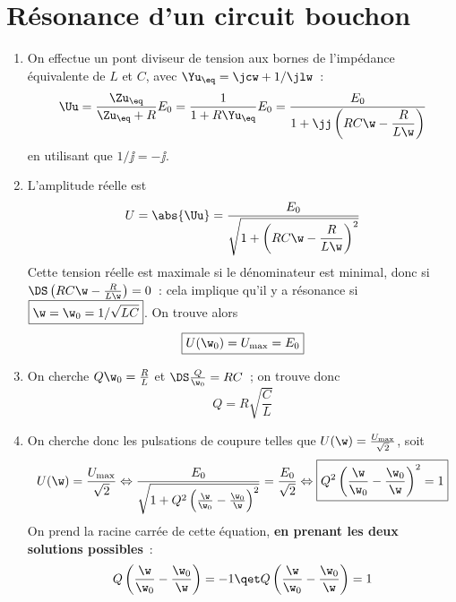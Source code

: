 \documentclass[a4paper, 12pt, final, garamond]{book}
\begin{document}
\section{Résonance d'un circuit bouchon}
\begin{enumerate}
    \item On effectue un pont diviseur de tension aux bornes de l'impédance
        équivalente de $L$ et $C$, avec $\Yu_{\eq} = \jcw + 1/\jlw$~:
        \begin{gather*}
            \Uu
                = \frac{\Zu_{\eq}}{\Zu_{\eq} + R}E_0
                = \frac{1}{1+R\Yu_{\eq}}E_0
                = \frac{E_0}{1+\jj \left( RC\w - \dfrac{R}{L\w} \right)}
        \end{gather*}
        en utilisant que $1/\jj = -\jj$.
    \item L'amplitude réelle est
        \begin{gather*}
            U = \abs{\Uu} = \frac{E_0}{\sqrt{1 + \left( RC\w - \dfrac{R}{L\w}
            \right)^2}}
        \end{gather*}
        Cette tension réelle est maximale si le dénominateur est minimal, donc
        si $\DS \left( RC\w - \frac{R}{L\w} \right) = 0$~: cela implique qu'il y
        a résonance si $\boxed{\w = \w_0 = 1/\sqrt{LC}}$. On trouve alors
        \begin{gather*}
            \boxed{U(\w_0) = U_{\max} = E_0}
        \end{gather*}
    \item On cherche $Q\w_0 = \frac{R}{L}$ et $\DS\frac{Q}{\w_0} = RC$~; on
        trouve donc
        \[\boxed{Q = R \sqrt{\frac{C}{L}}}\]
    \item On cherche donc les pulsations de coupure telles que $U(\w) =
        \frac{U_{\max}}{\sqrt{2}}$, soit
        \begin{gather*}
            U(\w) = \frac{U_{\max}}{\sqrt{2}}
            \Leftrightarrow
            \frac{E_0}{\sqrt{1 + Q^2\left( \frac{\w}{\w_0} - \frac{\w_0}{\w}
                    \right)^2}}
                =
                \frac{E_0}{\sqrt{2}}
                \Leftrightarrow
                \boxed{Q^2\left( \frac{\w}{\w_0} - \frac{\w_0}{\w} \right)^2 = 1}
        \end{gather*}
        On prend la racine carrée de cette équation, \textbf{en prenant les deux
        solutions possibles}~:
        \begin{align*}
            Q\left( \frac{\w}{\w_0} - \frac{\w_0}{\w} \right) = -1
            &\qet
            Q\left( \frac{\w}{\w_0} - \frac{\w_0}{\w} \right) = 1\\

\end{align*}
\end{enumerate}
\end{document}
